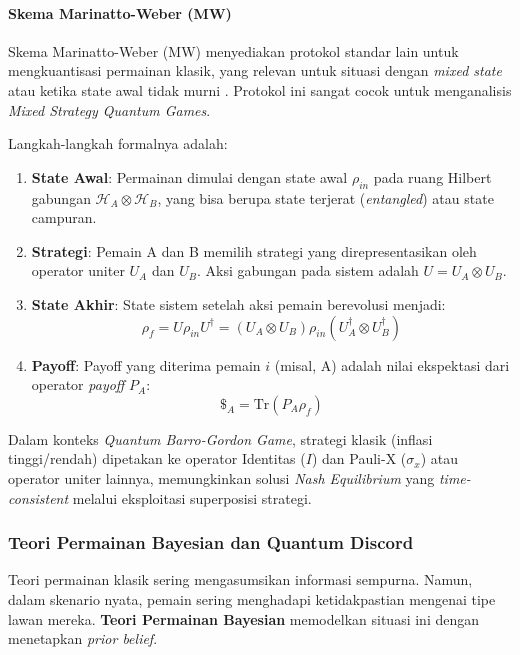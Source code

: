 \paragraph{Skema Marinatto-Weber (MW)}

Skema Marinatto-Weber (MW) menyediakan protokol standar lain untuk mengkuantisasi permainan klasik, yang relevan untuk situasi dengan \textit{mixed state} atau ketika state awal tidak murni \citep{marinatto_quantum_2000, samadi_quantum_2017}. Protokol ini sangat cocok untuk menganalisis \textit{Mixed Strategy Quantum Games}.

Langkah-langkah formalnya adalah:

\begin{enumerate}
    \item \textbf{State Awal}: Permainan dimulai dengan state awal $\rho_{in}$ pada ruang Hilbert gabungan $\mathcal{H}_A \otimes \mathcal{H}_B$, yang bisa berupa state terjerat (\textit{entangled}) atau state campuran.
    \item \textbf{Strategi}: Pemain A dan B memilih strategi yang direpresentasikan oleh operator uniter $U_A$ dan $U_B$. Aksi gabungan pada sistem adalah $U = U_A \otimes U_B$.
    \item \textbf{State Akhir}: State sistem setelah aksi pemain berevolusi menjadi:
    \[ \rho_f = U \rho_{in} U^\dagger = (U_A \otimes U_B) \rho_{in} (U_A^\dagger \otimes U_B^\dagger) \]
    \item \textbf{Payoff}: Payoff yang diterima pemain $i$ (misal, A) adalah nilai ekspektasi dari operator \textit{payoff} $P_A$:
    \[ \$_{A} = \text{Tr}(P_A \rho_f) \]
\end{enumerate}

Dalam konteks \textit{Quantum Barro-Gordon Game}, strategi klasik (inflasi tinggi/rendah) dipetakan ke operator Identitas ($I$) dan Pauli-X ($\sigma_x$) atau operator uniter lainnya, memungkinkan solusi \textit{Nash Equilibrium} yang \textit{time-consistent} melalui eksploitasi superposisi strategi.

\subsubsection{Teori Permainan Bayesian dan Quantum Discord}

Teori permainan klasik sering mengasumsikan informasi sempurna. Namun, dalam skenario nyata, pemain sering menghadapi ketidakpastian mengenai tipe lawan mereka. \textbf{Teori Permainan Bayesian} memodelkan situasi ini dengan menetapkan \textit{prior belief}.

